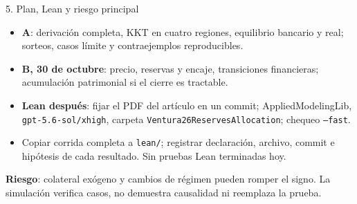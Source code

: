 \documentclass[aspectratio=169,11pt]{beamer}
\begin{document}
\begin{frame}{5. Plan, Lean y riesgo principal}
\begin{itemize}
 \item \textbf{A}: derivaci\'on completa, KKT en cuatro regiones, equilibrio
 bancario y real; sorteos, casos l\'imite y contraejemplos reproducibles.
 \item \textbf{B, 30 de octubre}: precio, reservas y encaje, transiciones
 financieras; acumulaci\'on patrimonial si el cierre es tractable.
 \item \textbf{Lean despu\'es}: fijar el PDF del art\'iculo en un commit;
 AppliedModelingLib, \texttt{gpt-5.6-sol/xhigh}, carpeta
 \texttt{Ventura26ReservesAllocation}; chequeo \texttt{--fast}.
 \item Copiar corrida completa a \texttt{lean/}; registrar declaraci\'on,
 archivo, commit e hip\'otesis de cada resultado. Sin pruebas Lean terminadas hoy.
\end{itemize}
\medskip
\textbf{Riesgo}: colateral ex\'ogeno y cambios de r\'egimen pueden romper el
signo. La simulaci\'on verifica casos, no demuestra causalidad ni reemplaza la prueba.
\end{frame}
\end{document}
